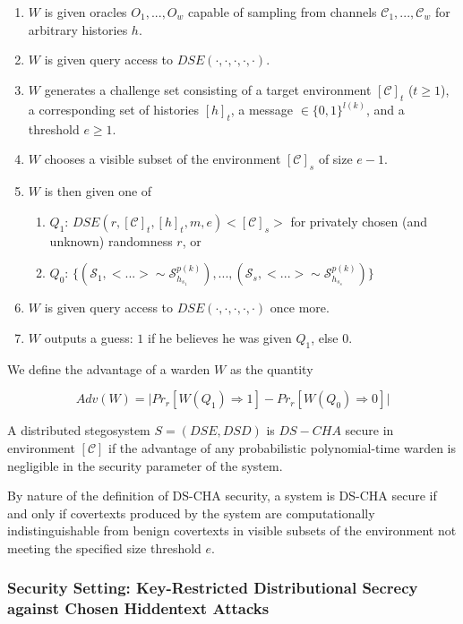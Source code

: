 \documentclass{article}
\begin{document}
\begin{enumerate}
\item{$W$ is given oracles $O_1,...,O_w$ capable of sampling from channels $\mathcal{C}_{1},...,\mathcal{C}_{w}$ for arbitrary histories 
$h$.}
\item{$W$ is given query access to $DSE(\cdot,\cdot,\cdot,\cdot,\cdot)$.}
\item{$W$ generates a challenge set consisting of a target environment $[\mathcal{C}]_t$ ($t \geq 1$), a corresponding set of histories 
$[h]_t$, a message $\in \{0,1\}^{l(k)}$, and a threshold $e \geq 1$.}
\item{$W$ chooses a visible subset of the environment $[\mathcal{C}]_s$ of size $e-1$.}
\item{$W$ is then given one of }
\begin{enumerate}
\item{$Q_1$: $DSE(r,[\mathcal{C}]_t, [h]_t, m, e)<[\mathcal{C}]_s>$ for privately chosen (and unknown) randomness $r$, or}
\item{$Q_0$: $\{ (\mathcal{S}_1, <...> \sim \mathcal{S}_{h_{s_1}}^{p(k)}), ..., (\mathcal{S}_s, <...> \sim \mathcal{S}_{h_{s_s}}^{p(k)})\}$}
\end{enumerate}
\item{$W$ is given query access to $DSE(\cdot,\cdot,\cdot,\cdot,\cdot)$ once more.}
\item{$W$ outputs a guess: $1$ if he believes he was given $Q_1$, else $0$.}
\end{enumerate}

\noindent We define the advantage of a warden $W$ as the quantity

\[ Adv(W) = \lvert Pr_r[W(Q_1) \Rightarrow 1] - Pr_r[W(Q_0) \Rightarrow 0] \rvert \]

\noindent A distributed stegosystem $S = (DSE, DSD)$ is $DS-CHA$ secure in environment $[\mathcal{C}]$ if the advantage 
of any probabilistic polynomial-time warden is negligible in the security parameter of the system.  

By nature of the definition of DS-CHA security, a system is DS-CHA secure if and only if covertexts produced by the system 
are computationally indistinguishable from benign covertexts in visible subsets of the environment not meeting the specified size threshold $e$.

\subsubsection{Security Setting: Key-Restricted Distributional Secrecy against Chosen Hiddentext Attacks}
\end{document}
